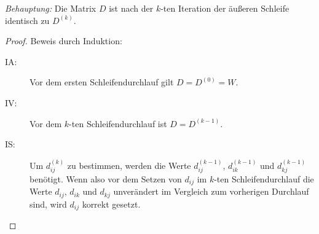 \documentclass[11pt,a4paper]{article}
\begin{document}
\begin{loesung}
\begin{enumerate}
        \emph{Behauptung:} Die Matrix $D$ ist nach der $k$-ten Iteration der äußeren Schleife identisch zu $D^{(k)}$.
        \begin{proof}
            Beweis durch Induktion:
            \begin{description}
                \item[IA:] Vor dem ersten Schleifendurchlauf gilt $D = D^{(0)} = W$.
                \item[IV:] Vor dem $k$-ten Schleifendurchlauf ist $D = D^{(k - 1)}$.
                \item[IS:] Um $d_{ij}^{(k)}$ zu bestimmen, werden die Werte $d_{ij}^{(k - 1)}$, $d_{ik}^{(k - 1)}$ und $d_{kj}^{(k - 1)}$ benötigt.
                Wenn also vor dem Setzen von $d_{ij}$ im $k$-ten Schleifendurchlauf die Werte $d_{ij}$, $d_{ik}$ und $d_{kj}$ unverändert im Vergleich zum vorherigen Durchlauf sind, wird $d_{ij}$ korrekt gesetzt.


\end{description}
\end{proof}
\end{enumerate}
\end{loesung}
\end{document}
